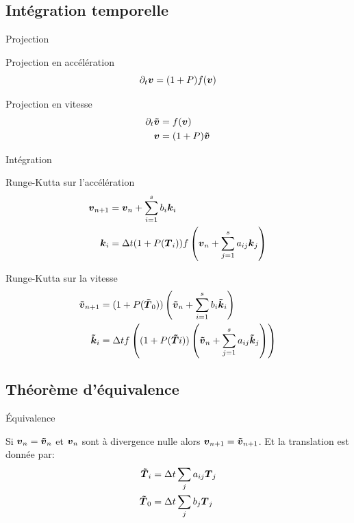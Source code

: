 \subsection{Intégration temporelle}
\begin{frame}[<+->]{Projection}
\begin{block}{Projection en accélération}
\begin{equation*}
 \partial_t {\boldsymbol {v}}=(1+P)f({\boldsymbol {v}})
 \end{equation*}
\end{block}

\begin{block}{Projection en vitesse}
\begin{align*}
 \partial_t {\boldsymbol {\tilde{v}}}&=f({\boldsymbol {v}})\\
 {\boldsymbol {v}}&=(1+P){\boldsymbol {\tilde{v}}}
 \end{align*}
\end{block}
 
\end{frame}

\begin{frame}[<+->]{Intégration}
 \begin{block}{Runge-Kutta sur l'accélération}
   \begin{align*}
	{\boldsymbol {v}}_{n+1}&={\boldsymbol {v}}_{n}+\sum_{i=1}^{s}b_{i}{\boldsymbol {k}}_{i}\\
	{\boldsymbol {k}}_{i}&=\Delta t (1+P({\boldsymbol {T}}_{i}))f\left({\boldsymbol {v}}_{n}+\sum_{j=1}^{s}a_{ij}{\boldsymbol {k}}_{j}\right)
\end{align*}
 \end{block}
 
  \begin{block}{Runge-Kutta sur la vitesse}
   \begin{align*}
{\boldsymbol {\tilde{v}}}_{n+1}&=(1+P({\boldsymbol {\tilde{T}}}_0))\left({\boldsymbol {\tilde{v}}}_{n}+\sum_{i=1}^{s}b_{i}{\boldsymbol {\tilde{k}}}_{i}\right)\\
{\boldsymbol {\tilde{k}}}_{i}&=\Delta t f\left((1+P({\boldsymbol {\tilde{T}}}{i}))\left({\boldsymbol {\tilde{v}}}_{n}+\sum_{j=1}^{s}a_{ij}{\boldsymbol {\tilde{k}}}_{j}\right)\right)
\end{align*}
 \end{block}
\end{frame}
\subsection{Théorème d'équivalence}
\begin{frame}{Équivalence}
 \begin{theorem}
Si ${\boldsymbol {v}}_{n}={\boldsymbol {\tilde{v}}}_{n}$ et ${\boldsymbol {v}}_n$ sont à divergence nulle alors ${\boldsymbol {v}}_{n+1}={\boldsymbol {\tilde{v}}}_{n+1}$.
Et la translation est donnée par:
\begin{align*}
  {\boldsymbol {\tilde{T}}}_{i}&=\Delta t\sum_{j}a_{ij}{\boldsymbol {T}}_{j}\\
  {\boldsymbol {\tilde{T}}}_{0}&=\Delta t\sum_{j}b_{j}{\boldsymbol {T}}_{j}
\end{align*}
 \end{theorem}
\end{frame}

